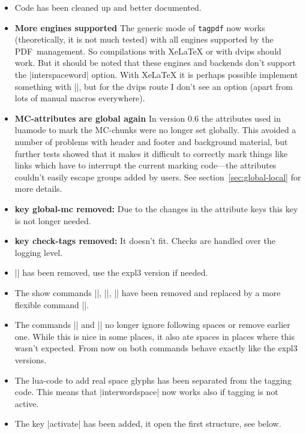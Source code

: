 \documentclass[DIV=12,parskip=half-,bibliography=totoc,a4paper]{article}
\newcommand\pkg[1]{\texttt{#1}}
\newcommand\PDF{PDF}
\begin{document}
\begin{itemize}
\item Code has been cleaned up and better documented.

\item \textbf{More engines supported} The generic mode of \pkg{tagpdf} now works
(theoretically, it is not much tested) with all engines supported
by the \PDF\ management. 
So compilations with Xe\LaTeX{} or with dvips should work. But it should be noted that
these engines and backends don't support the |interspaceword| option. With Xe\LaTeX{} it is perhaps possible
implement something with |\XeTeXinterchartoks|, but for the dvips route I don't see an option (apart from lots
of manual macros everywhere).
\item \textbf{MC-attributes are global again} In version 0.6 the attributes used in
luamode to mark the MC-chunks were no longer set globally. This avoided a number of problems with header and footer
and background material, but further tests showed that it makes it difficult to correctly mark things like
links which have to interrupt the current marking code---the attributes couldn't easily escape groups added by
users. See section~\ref{sec:global-local} for more details.
\item \textbf{key global-mc removed:} Due to the changes in the attribute keys this key is not longer needed.
\item \textbf{key check-tags removed:} It doesn't fit. Checks are handled over the logging level.
\item |\tagpdfget| has been removed, use the expl3 version if needed.
\item The show commands |\showtagpdfmcdata|, |\showtagpdfattributes|, |\showtagstack| have been removed and replaced
by a more flexible command |\ShowTagging|.
\item The commands |\tagmcbegin| and |\tagmcend| no longer ignore following spaces or remove earlier one. While this
is nice in some places, it also ate spaces in places where this wasn't expected. From now on both commands behave exactly
like the expl3 versions.
\item The lua-code to add real space glyphs has been separated from the tagging code. This means that |interwordspace| now
works also if tagging is not active.
\item The key |activate| has been added, it open the first structure, see below.
\end{itemize}
\end{document}

